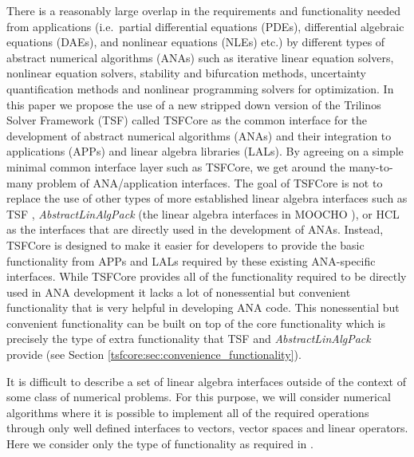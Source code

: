 \documentclass[10pt,fleqn]{article}
\begin{document}
There is a reasonably large overlap in the requirements and
functionality needed from applications (i.e.~partial differential
equations (PDEs), differential algebraic equations (DAEs), and
nonlinear equations (NLEs) etc.) by different types of abstract
numerical algorithms (ANAs) such as iterative linear equation solvers,
nonlinear equation solvers, stability and bifurcation methods,
uncertainty quantification methods and nonlinear programming solvers
for optimization.  In this paper we propose the use of a new stripped
down version of the Trilinos Solver Framework (TSF) called TSFCore as
the common interface for the development of abstract numerical
algorithms (ANAs) and their integration to applications (APPs) and
linear algebra libraries (LALs).  By agreeing on a simple minimal
common interface layer such as TSFCore, we get around the many-to-many
problem of ANA/application interfaces.  The goal of TSFCore is not to
replace the use of other types of more established linear algebra
interfaces such as TSF \cite{ref:TSF}, \textit{AbstractLinAlgPack}
(the linear algebra interfaces in MOOCHO \cite{ref:moochouserguide}),
or HCL \cite{ref:hcl} as the interfaces that are directly used in the
development of ANAs.  Instead, TSFCore is designed to make it easier
for developers to provide the basic functionality from APPs and LALs
required by these existing ANA-specific interfaces.  While TSFCore
provides all of the functionality required to be directly used in ANA
development it lacks a lot of nonessential but convenient functionality that is
very helpful in developing ANA code.  This nonessential but convenient
functionality can be built on top of the core functionality which is
precisely the type of extra functionality that TSF and
\textit{AbstractLinAlgPack} provide (see Section
\ref{tsfcore:sec:convenience_functionality}).

It is difficult to describe a set of linear algebra interfaces outside
of the context of some class of numerical problems.  For this purpose,
we will consider numerical algorithms where it is possible to implement
all of the required operations through only well defined interfaces
to vectors, vector spaces and linear operators.  Here we consider
only the type of functionality as required in \cite{ref:opt_ctrl_itfc}.
\end{document}
